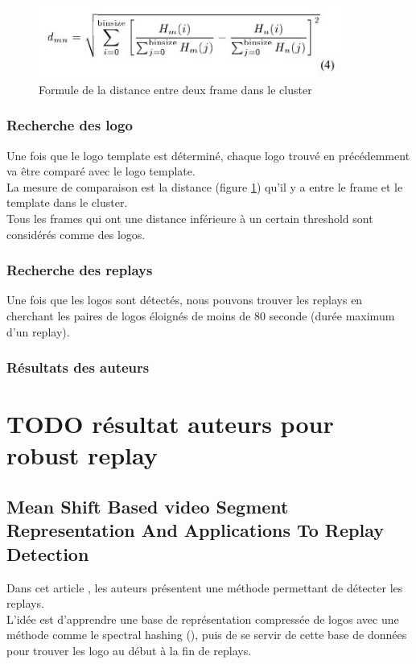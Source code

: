 \documentclass[11pt]{article}
\begin{document}
\begin{figure}[htbp]
\centering
\includegraphics[width=10cm]{robust_calc_dist.JPG}
\caption{Formule de la distance entre deux frame dans le cluster \label{calc-dist}}
\end{figure}


\subsubsection{Recherche des logo}
\label{sec:org24b91dd}
Une fois que le logo template est déterminé, chaque logo trouvé en précédemment va être comparé avec le logo template.\\
La mesure de comparaison est la distance (figure \ref{calc-dist}) qu'il y a entre le frame et le template dans le cluster.\\
Tous les frames qui ont une distance inférieure à un certain threshold sont considérés comme des logos.\\

\subsubsection{Recherche des replays}
\label{sec:org6eca6b3}
Une fois que les logos sont détectés, nous pouvons trouver les replays en cherchant les paires de logos éloignés de moins de 80 seconde (durée maximum d'un replay).\\

\subsubsection{Résultats des auteurs}
\label{sec:org667fb0c}
\section{{\bfseries\sffamily TODO} résultat auteurs pour robust replay}
\label{sec:org65e4a66}




\subsection{Mean Shift Based video Segment Representation And Applications To Replay Detection}
\label{sec:orgb20c02b}
Dans cet article \cite{Ling_Yu_Duan}, les auteurs présentent une méthode permettant de détecter les replays.\\
L'idée est d'apprendre une base de représentation compressée de logos avec une méthode comme le spectral hashing (\cite{NIPS2008_3383}), puis de se servir de cette base de données pour trouver les logo au début à la fin de replays.\\
\end{document}
